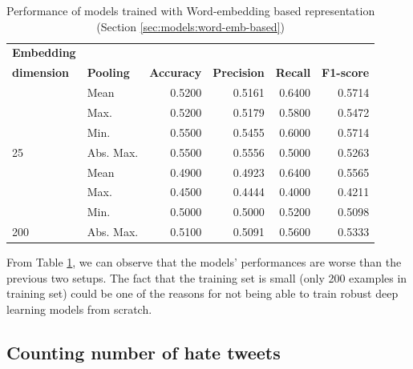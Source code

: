 \begin{table}[htbp]
\centering
\begin{tabular}{llrrrr}
\hline
\multicolumn{1}{l}{\textbf{Embedding}} &  & \multicolumn{1}{l}{} & \multicolumn{1}{l}{} & \multicolumn{1}{l}{} & \multicolumn{1}{l}{} \\
\multicolumn{1}{l}{\textbf{dimension}} & \multirow{-2}{*}{\textbf{Pooling}} & \multicolumn{1}{l}{\multirow{-2}{*}{\textbf{Accuracy}}} & \multicolumn{1}{l}{\multirow{-2}{*}{\textbf{Precision}}} & \multicolumn{1}{l}{\multirow{-2}{*}{\textbf{Recall}}} & \multicolumn{1}{l}{\multirow{-2}{*}{\textbf{F1-score}}} \\ \hline
 & Mean & 0.5200 & 0.5161 & 0.6400 & 0.5714 \\
 & Max. & 0.5200 & 0.5179 & 0.5800 & 0.5472 \\
 & Min. & 0.5500 & 0.5455 & 0.6000 & 0.5714 \\
\multirow{-4}{*}{25} & Abs. Max. & 0.5500 & 0.5556 & 0.5000 & 0.5263 \\ \hline
 & Mean & 0.4900 & 0.4923 & 0.6400 & 0.5565 \\
 & Max. & 0.4500 & 0.4444 & 0.4000 & 0.4211 \\
 & Min. & 0.5000 & 0.5000 & 0.5200 & 0.5098 \\
\multirow{-4}{*}{200} & Abs. Max. & 0.5100 & 0.5091 & 0.5600 & 0.5333 \\ \hline
\end{tabular}
\caption{Performance of models trained with Word-embedding based representation (Section \ref{sec:models:word-emb-based})}
\label{tab:results:performance-word-emb-based}
\end{table}


From Table \ref{tab:results:performance-word-emb-based}, we can observe that the models' performances are worse than the previous two setups. The fact that the training set is small (only 200 examples in training set) could be one of the reasons for not being able to train robust deep learning models from scratch.


\subsection{Counting number of hate tweets}
\label{sec:results:count-hate}

